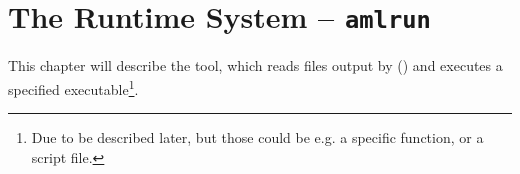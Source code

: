 
\chapter[The Runtime System -- amlrun]{The Runtime System -- \lstinline!amlrun!}
\label{ch:tools-amlrun}

This chapter will describe the \ToolAmlrun tool, which reads files output by \ToolAmlc () and executes a specified executable\footnote{Due to be described later, but those could be e.g. a specific function, or a script file.}.






